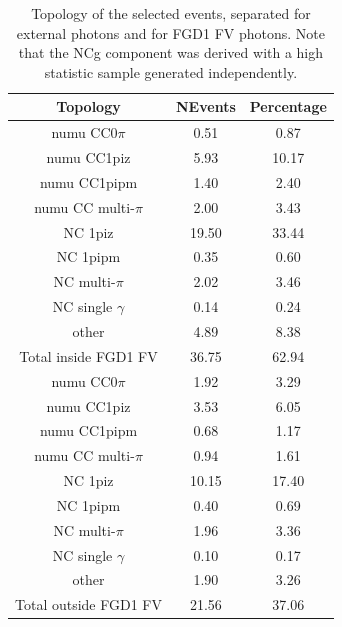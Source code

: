 \begin{table}[ht]
  \begin{adjustbox}{center}
    \begin{tabular}{ccc}
      \toprule
      Topology & NEvents & Percentage \\
      \midrule
      \Gls{numu} \Gls{CC}0$\pi$       & 0.51  & 0.87  \\
      \Gls{numu} \Gls{CC}1\Gls{piz}   & 5.93  & 10.17 \\
      \Gls{numu} \Gls{CC}1\Gls{pipm}  & 1.40  & 2.40  \\
      \Gls{numu} \Gls{CC} multi-$\pi$ & 2.00  & 3.43  \\
      \Gls{NC} 1\Gls{piz}             & 19.50 & 33.44 \\
      \Gls{NC} 1\Gls{pipm}            & 0.35  & 0.60  \\
      \Gls{NC} multi-$\pi$            & 2.02  & 3.46  \\
      \Gls{NC} single $\gamma$        & 0.14  & 0.24  \\
      other                           & 4.89  & 8.38  \\
      \midrule
      Total inside \Gls{FGD}1 \Gls{FV}& 36.75 & 62.94 \\ 
      \midrule
      \Gls{numu} \Gls{CC}0$\pi$       & 1.92  & 3.29  \\
      \Gls{numu} \Gls{CC}1\Gls{piz}   & 3.53  & 6.05  \\
      \Gls{numu} \Gls{CC}1\Gls{pipm}  & 0.68  & 1.17  \\
      \Gls{numu} \Gls{CC} multi-$\pi$ & 0.94  & 1.61  \\
      \Gls{NC} 1\Gls{piz}             & 10.15 & 17.40 \\
      \Gls{NC} 1\Gls{pipm}            & 0.40  & 0.69  \\
      \Gls{NC} multi-$\pi$            & 1.96  & 3.36  \\
      \Gls{NC} single $\gamma$        & 0.10  & 0.17  \\
      other                           & 1.90  & 3.26  \\
      \midrule
      Total outside \Gls{FGD}1 \Gls{FV}& 21.56 & 37.06 \\
      \bottomrule
    \end{tabular}
  \end{adjustbox}
  \caption[Topology of the selected events]{Topology of the selected
    events, separated for external photons and for \Gls{FGD}1 \Gls{FV}
    photons.  Note that the \Gls{NCg} component was derived with a
    high statistic sample generated independently.}
  \label{tab:topo}
\end{table}

